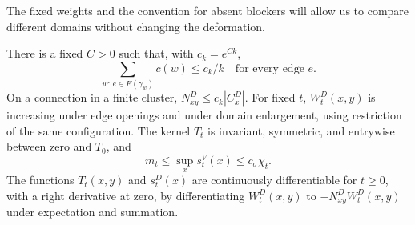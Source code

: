 The fixed weights and the convention for absent blockers will allow us to
compare different domains without changing the deformation.

\begin{lemma}\label{def:basic}
There is a fixed $C>0$ such that, with $c_k=e^{Ck}$,
\begin{equation}\label{def:edge-weight}
 \sum_{w:\,e\in E(\gamma_w)}c(w)\le c_k/k
 \quad\text{for every edge }e.
\end{equation}
On a connection in a finite cluster,
$N^D_{xy}\le c_k|C_x^D|$.
For fixed $t$, $W_t^D(x,y)$ is increasing under edge openings and under
domain enlargement, using restriction of the same configuration.
The kernel $T_t$ is invariant, symmetric, and entrywise between zero and
$T_0$, and
\begin{equation}\label{def:row-norm}
 m_t\le\sup_x s_t^V(x)\le c_\sigma\chi_t.
\end{equation}
The functions $T_t(x,y)$ and $s_t^D(x)$ are continuously differentiable for
$t\ge0$, with a right derivative at zero, by differentiating
$W_t^D(x,y)$ to $-N^D_{xy}W_t^D(x,y)$ under expectation and summation.
\end{lemma}

